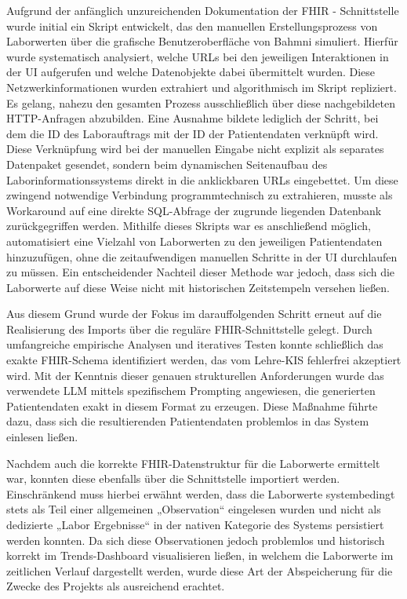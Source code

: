 \begin{description}[style=nextline, font=\bfseries]
    \item[Ergebnisse] 
    Aufgrund der anfänglich unzureichenden Dokumentation der FHIR - Schnittstelle wurde initial ein Skript entwickelt, das den manuellen Erstellungsprozess von Laborwerten über die grafische Benutzeroberfläche von Bahmni simuliert. Hierfür wurde systematisch analysiert, welche URLs bei den jeweiligen Interaktionen in der UI aufgerufen und welche Datenobjekte dabei übermittelt wurden. Diese Netzwerkinformationen wurden extrahiert und algorithmisch im Skript repliziert. Es gelang, nahezu den gesamten Prozess ausschließlich über diese nachgebildeten HTTP-Anfragen abzubilden. Eine Ausnahme bildete lediglich der Schritt, bei dem die ID des Laborauftrags  mit der ID der Patientendaten verknüpft wird. Diese Verknüpfung wird bei der manuellen Eingabe nicht explizit als separates Datenpaket gesendet, sondern beim dynamischen Seitenaufbau des Laborinformationssystems direkt in die anklickbaren URLs eingebettet. Um diese zwingend notwendige Verbindung programmtechnisch zu extrahieren, musste als Workaround auf eine direkte SQL-Abfrage der zugrunde liegenden Datenbank zurückgegriffen werden. Mithilfe dieses Skripts war es anschließend möglich, automatisiert eine Vielzahl von Laborwerten zu den jeweiligen Patientendaten hinzuzufügen, ohne die zeitaufwendigen manuellen Schritte in der UI durchlaufen zu müssen. Ein entscheidender Nachteil dieser Methode war jedoch, dass sich die Laborwerte auf diese Weise nicht mit historischen Zeitstempeln versehen ließen. 
    
    Aus diesem Grund wurde der Fokus im darauffolgenden Schritt erneut auf die Realisierung des Imports über die reguläre FHIR-Schnittstelle gelegt. Durch umfangreiche empirische Analysen und iteratives Testen konnte schließlich das exakte FHIR-Schema identifiziert werden, das vom Lehre-KIS fehlerfrei akzeptiert wird. Mit der Kenntnis dieser genauen strukturellen Anforderungen wurde das verwendete LLM mittels spezifischem Prompting angewiesen, die generierten Patientendaten exakt in diesem Format zu erzeugen. Diese Maßnahme führte dazu, dass sich die resultierenden Patientendaten problemlos in das System einlesen ließen.
    
    Nachdem auch die korrekte FHIR-Datenstruktur für die Laborwerte ermittelt war, konnten diese ebenfalls über die Schnittstelle importiert werden. Einschränkend muss hierbei erwähnt werden, dass die Laborwerte systembedingt stets als Teil einer allgemeinen „Observation“ eingelesen wurden und nicht als dedizierte „Labor Ergebnisse“ in der nativen Kategorie des Systems persistiert werden konnten. Da sich diese Observationen jedoch problemlos und historisch korrekt im Trends-Dashboard visualisieren ließen, in welchem die Laborwerte im zeitlichen Verlauf dargestellt werden, wurde diese Art der Abspeicherung für die Zwecke des Projekts als ausreichend erachtet.


\end{description}
